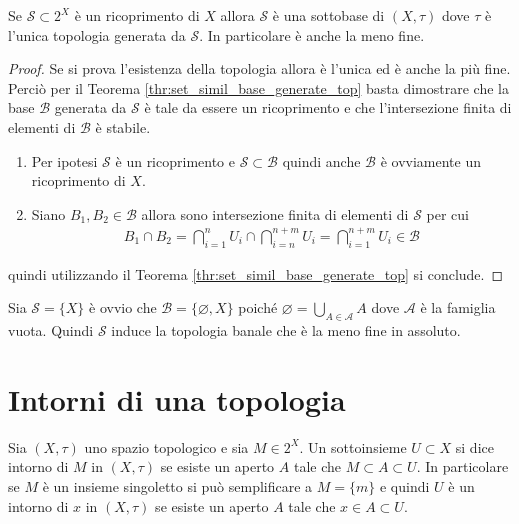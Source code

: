 \begin{proposition}
	Se $\mathcal{S} \subset 2^X$ è un ricoprimento di $X$ allora $\mathcal{S}$ è una sottobase di $(X,\tau)$ dove $\tau$ è l'unica topologia generata da $\mathcal{S}$. In particolare è anche la meno fine.
\end{proposition}
\begin{proof}
	Se si prova l'esistenza della topologia allora è l'unica ed è anche la più fine.
	Perciò per il Teorema \ref{thr:set_simil_base_generate_top} basta dimostrare che la base $\mathcal{B}$ generata da $\mathcal{S}$ è tale da essere un ricoprimento e che l'intersezione finita di elementi di $\mathcal{B}$ è stabile.\\
	\begin{enumerate}
		\item Per ipotesi $\mathcal{S}$ è un ricoprimento e $\mathcal{S} \subset \mathcal{B}$ quindi anche $\mathcal{B}$ è ovviamente un ricoprimento di $X$.
		\item Siano $B_1, B_2 \in \mathcal{B}$ allora sono intersezione finita di elementi di $\mathcal{S}$ per cui
		\begin{equation}
		\begin{aligned}
			B_1 \cap B_2 = \bigcap^n_{i=1} U_i \cap \bigcap^{n+m}_{i=n} U_i = \bigcap^{n+m}_{i=1} U_i  \in \mathcal{B}
		\end{aligned}
		\end{equation}
	\end{enumerate}
	quindi utilizzando il Teorema \ref{thr:set_simil_base_generate_top} si conclude.
	\end{proof}

\begin{remark}
	Sia $\mathcal{S} = \{X\}$ è ovvio che $\mathcal{B} = \{\varnothing, X\}$ poiché $\varnothing = \bigcup_{A \in \mathcal{A}} A $ dove $\mathcal{A}$ è la famiglia vuota. Quindi $\mathcal{S}$ induce la topologia banale che è la meno fine in assoluto.
\end{remark}

\section{Intorni di una topologia}

\begin{definition}
	Sia $(X,\tau)$ uno spazio topologico e sia $M \in 2^X$. Un sottoinsieme $U \subset X$ si dice intorno di $M$ in $(X,\tau)$ se esiste un aperto $A$ tale che $M \subset A \subset U$. In particolare se $M$ è un insieme singoletto si può semplificare a $M = \{m\}$ e quindi $U$ è un intorno di $x$ in $(X,\tau)$ se esiste un aperto $A$ tale che $x \in A \subset U$.
\end{definition}

